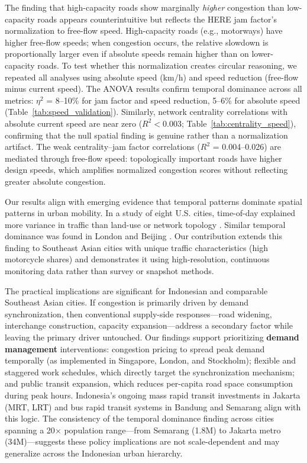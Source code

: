 \documentclass[review,authoryear]{elsarticle}
\begin{document}
The finding that high-capacity roads show marginally \textit{higher} congestion than low-capacity roads appears counterintuitive but reflects the HERE jam factor's normalization to free-flow speed. High-capacity roads (e.g., motorways) have higher free-flow speeds; when congestion occurs, the relative slowdown is proportionally larger even if absolute speeds remain higher than on lower-capacity roads. To test whether this normalization creates circular reasoning, we repeated all analyses using absolute speed (km/h) and speed reduction (free-flow minus current speed). The ANOVA results confirm temporal dominance across all metrics: $\eta^2$ = 8--10\% for jam factor and speed reduction, 5--6\% for absolute speed (Table~\ref{tab:speed_validation}). Similarly, network centrality correlations with absolute current speed are near zero ($R^2 < 0.003$; Table~\ref{tab:centrality_speed}), confirming that the null spatial finding is genuine rather than a normalization artifact. The weak centrality--jam factor correlations ($R^2$ = 0.004--0.026) are mediated through free-flow speed: topologically important roads have higher design speeds, which amplifies normalized congestion scores without reflecting greater absolute congestion.

Our results align with emerging evidence that temporal patterns dominate spatial patterns in urban mobility. In a study of eight U.S. cities, time-of-day explained more variance in traffic than land-use or network topology \citep{Kang2020}. Similar temporal dominance was found in London \citep{Todd2019} and Beijing \citep{Zhang2017}. Our contribution extends this finding to Southeast Asian cities with unique traffic characteristics (high motorcycle shares) and demonstrates it using high-resolution, continuous monitoring data rather than survey or snapshot methods.

The practical implications are significant for Indonesian and comparable Southeast Asian cities. If congestion is primarily driven by demand synchronization, then conventional supply-side responses---road widening, interchange construction, capacity expansion---address a secondary factor while leaving the primary driver untouched. Our findings support prioritizing \textbf{demand management} interventions: congestion pricing to spread peak demand temporally (as implemented in Singapore, London, and Stockholm); flexible and staggered work schedules, which directly target the synchronization mechanism; and public transit expansion, which reduces per-capita road space consumption during peak hours. Indonesia's ongoing mass rapid transit investments in Jakarta (MRT, LRT) and bus rapid transit systems in Bandung and Semarang align with this logic. The consistency of the temporal dominance finding across cities spanning a 20$\times$ population range---from Semarang (1.8M) to Jakarta metro (34M)---suggests these policy implications are not scale-dependent and may generalize across the Indonesian urban hierarchy.
\end{document}
